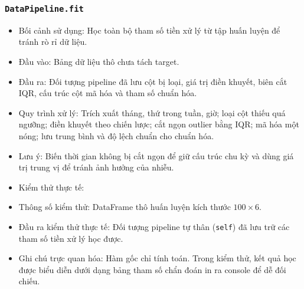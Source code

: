 \documentclass[a4paper]{article}
\newcommand{\code}[1]{\colorbox{light-gray}{\texttt{#1}}}
\begin{document}
\subsubsection{\texorpdfstring{\code{DataPipeline.fit}}{DataPipeline.fit}}
\begin{itemize}[leftmargin=*]
    \item Bối cảnh sử dụng: Học toàn bộ tham số tiền xử lý từ tập huấn luyện để tránh rò rỉ dữ liệu.
    \item Đầu vào: Bảng dữ liệu thô chưa tách target.
    \item Đầu ra: Đối tượng pipeline đã lưu cột bị loại, giá trị điền khuyết, biên cắt IQR, cấu trúc cột mã hóa và tham số chuẩn hóa.
    \item Quy trình xử lý: Trích xuất tháng, thứ trong tuần, giờ; loại cột thiếu quá ngưỡng; điền khuyết theo chiến lược; cắt ngọn outlier bằng IQR; mã hóa một nóng; lưu trung bình và độ lệch chuẩn cho chuẩn hóa.
    \item Lưu ý: Biến thời gian không bị cắt ngọn để giữ cấu trúc chu kỳ và dùng giá trị trung vị để tránh ảnh hưởng của nhiễu.
    \item Kiểm thử thực tế:
    \item Thông số kiểm thử: DataFrame thô huấn luyện kích thước $100 \times 6$.
    \item Đầu ra kiểm thử thực tế: Đối tượng pipeline tự thân (\texttt{self}) đã lưu trữ các tham số tiền xử lý học được.
    \item Ghi chú trực quan hóa: Hàm gốc chỉ tính toán. Trong kiểm thử, kết quả học được biểu diễn dưới dạng bảng tham số chẩn đoán in ra console để dễ đối chiếu.
\end{itemize}
\end{document}
